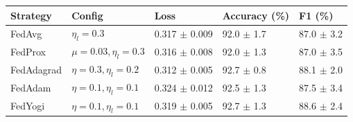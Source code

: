 \begin{tabular}{lllll}
\toprule
Strategy & Config & Loss & Accuracy (\%) & F1 (\%) \\
\midrule
FedAvg & $\eta_l=0.3$ & 0.317 $\pm$ 0.009 & 92.0 $\pm$ 1.7 & 87.0 $\pm$ 3.2 \\
FedProx & $\mu=0.03, \eta_l=0.3$ & 0.316 $\pm$ 0.008 & 92.0 $\pm$ 1.3 & 87.0 $\pm$ 3.5 \\
FedAdagrad & $\eta=0.3, \eta_l=0.2$ & 0.312 $\pm$ 0.005 & 92.7 $\pm$ 0.8 & 88.1 $\pm$ 2.0 \\
FedAdam & $\eta=0.1, \eta_l=0.1$ & 0.324 $\pm$ 0.012 & 92.5 $\pm$ 1.3 & 87.5 $\pm$ 3.4 \\
FedYogi & $\eta=0.1, \eta_l=0.1$ & 0.319 $\pm$ 0.005 & 92.7 $\pm$ 1.3 & 88.6 $\pm$ 2.4 \\
\bottomrule
\end{tabular}
